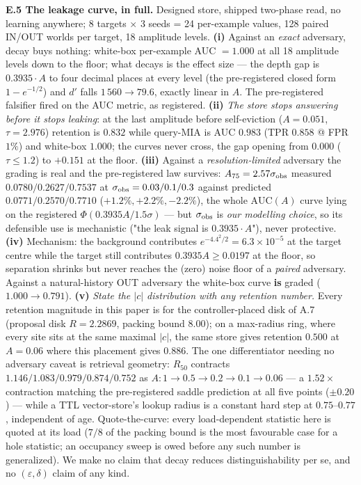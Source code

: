\documentclass{article}
\begin{document}
\textbf{E.5 The leakage curve, in full.} Designed store, shipped two-phase read, no learning anywhere; 8 targets $\times$ 3 seeds = 24 per-example values, 128 paired IN/OUT worlds per target, 18 amplitude levels. \textbf{(i)} Against an \emph{exact} adversary, decay buys nothing: white-box per-example AUC $=1.000$ at all 18 amplitude levels down to the floor; what decays is the effect size --- the depth gap is $0.3935\cdot A$ to four decimal places at every level (the pre-registered closed form $1-e^{-1/2}$) and $d'$ falls $1\,560\to79.6$, exactly linear in $A$. The pre-registered falsifier fired on the AUC metric, as registered. \textbf{(ii)} \emph{The store stops answering before it stops leaking}: at the last amplitude before self-eviction ($A=0.051$, $\tau=2.976$) retention is $0.832$ while query-MIA is AUC $0.983$ (TPR $0.858$ @ FPR $1\%$) and white-box $1.000$; the curves never cross, the gap opening from $0.000$ ($\tau\le1.2$) to $+0.151$ at the floor. \textbf{(iii)} Against a \emph{resolution-limited} adversary the grading is real and the pre-registered law survives: $A_{75}=2.57\sigma_{\rm obs}$ measured $0.0780/0.2627/0.7537$ at $\sigma_{\rm obs}=0.03/0.1/0.3$ against predicted $0.0771/0.2570/0.7710$ ($+1.2\%,+2.2\%,-2.2\%$), the whole $\mathrm{AUC}(A)$ curve lying on the registered $\Phi(0.3935A/1.5\sigma)$ --- but $\sigma_{\rm obs}$ is \emph{our modelling choice}, so its defensible use is mechanistic ("the leak signal is $0.3935\cdot A$"), never protective. \textbf{(iv)} Mechanism: the background contributes $e^{-4.4^2/2}=6.3\times10^{-5}$ at the target centre while the target still contributes $0.3935A\ge0.0197$ at the floor, so separation shrinks but never reaches the (zero) noise floor of a \emph{paired} adversary. Against a natural-history OUT adversary the white-box curve \textbf{is} graded ($1.000\to0.791$). \textbf{(v)} \emph{State the $|c|$ distribution with any retention number.} Every retention magnitude in this paper is for the controller-placed disk of A.7 (proposal disk $R=2.2869$, packing bound $8.00$); on a max-radius ring, where every site sits at the same maximal $|c|$, the same store gives retention $0.500$ at $A=0.06$ where this placement gives $0.886$. The one differentiator needing no adversary caveat is retrieval geometry: $R_{50}$ contracts $1.146/1.083/0.979/0.874/0.752$ as $A:1\to0.5\to0.2\to0.1\to0.06$ --- a $1.52\times$ contraction matching the pre-registered saddle prediction at all five points ($\pm0.20$) --- while a TTL vector-store's lookup radius is a constant hard step at $0.75$--$0.77$, independent of age. Quote-the-curve: every load-dependent statistic here is quoted at its load ($7/8$ of the packing bound is the most favourable case for a hole statistic; an occupancy sweep is owed before any such number is generalized). We make no claim that decay reduces distinguishability per se, and no $(\varepsilon,\delta)$ claim of any kind.
\end{document}
